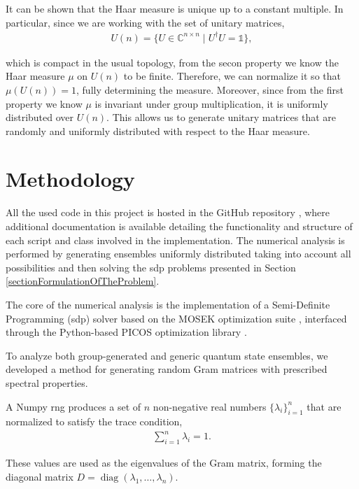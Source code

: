\documentclass[12pt,letterpaper]{article}
\begin{document}
It can be shown that the Haar measure is unique up to a constant multiple. In particular, since we are working with the set of unitary matrices,
\begin{align*}
	U(n) = \{ U \in \mathbb{C}^{n \times n} \mid U^\dagger U = \mathds{1} \},
\end{align*}

which is compact in the usual topology, from the secon property we know the Haar measure \( \mu \) on \( U(n) \) to be finite. Therefore, we can normalize it so that \( \mu(U(n)) = 1 \), fully determining the measure. Moreover, since from the first property we know \( \mu \) is invariant under group multiplication, it is uniformly distributed over \( U(n) \). This allows us to generate unitary matrices that are randomly and uniformly distributed with respect to the Haar measure.

\newpage
\section{Methodology}\label{sectionMethodology}

\hspace{20pt}All the used code in this project is hosted in the GitHub repository \cite{GitHub}, where additional documentation is available detailing the functionality and structure of each script and class involved in the implementation. The numerical analysis is performed by generating ensembles uniformly distributed taking into account all possibilities and then solving the \gls{sdp} problems presented in Section \ref{sectionFormulationOfTheProblem}.

The core of the numerical analysis is the implementation of a Semi-Definite Programming (\gls{sdp}) solver based on the MOSEK optimization suite \cite{mosek_sdp}, interfaced through the Python-based PICOS optimization library \cite{PICOS}. 

To analyze both group-generated and generic quantum state ensembles, we developed a method for generating random Gram matrices with prescribed spectral properties.

A Numpy \gls{rng}\cite{numpyRNG} produces a set of $n$ non-negative real numbers $\{\lambda_i\}_{i=1}^n$ that are normalized to satisfy the trace condition,
\begin{align*}
	\sum_{i=1}^n \lambda_i = 1.
\end{align*}

These values are used as the eigenvalues of the Gram matrix, forming the diagonal matrix $D = \operatorname{diag}(\lambda_1, \dots, \lambda_n)$. 
\end{document}
